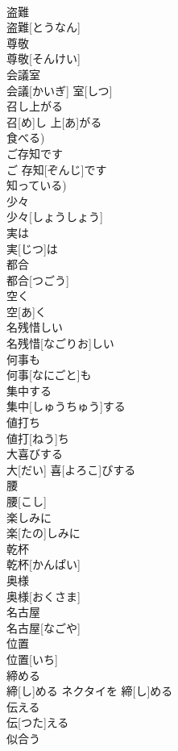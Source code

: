 \documentclass[8pt]{extreport}
\begin{document}
\begin{CJK}{UTF8}{min}
\\	盗難	
\\	盗難[とうなん]	
\\	尊敬	
\\	尊敬[そんけい]	
\\	会議室	
\\	会議[かいぎ] 室[しつ]	
\\	召し上がる	
\\	召[め]し 上[あ]がる	
\\	食べる)
\\	ご存知です	
\\	ご 存知[ぞんじ]です	
\\	知っている)
\\	少々	
\\	少々[しょうしょう]	
\\	実は	
\\	実[じつ]は	
\\	都合	
\\	都合[つごう]	
\\	空く	
\\	空[あ]く	
\\	名残惜しい	
\\	名残惜[なごりお]しい	
\\	何事も	
\\	何事[なにごと]も	
\\	集中する	
\\	集中[しゅうちゅう]する	
\\	値打ち	
\\	値打[ねう]ち	
\\	大喜びする	
\\	大[だい] 喜[よろこ]びする	
\\	腰	
\\	腰[こし]	
\\	楽しみに	
\\	楽[たの]しみに	
\\	乾杯	
\\	乾杯[かんぱい]	
\\	奥様	
\\	奥様[おくさま]	
\\	名古屋	
\\	名古屋[なごや]	
\\	位置	
\\	位置[いち]	
\\	締める	
\\	締[し]める	ネクタイを 締[し]める 
\\	伝える	
\\	伝[つた]える	
\\	似合う	

\end{CJK}
\end{document}
